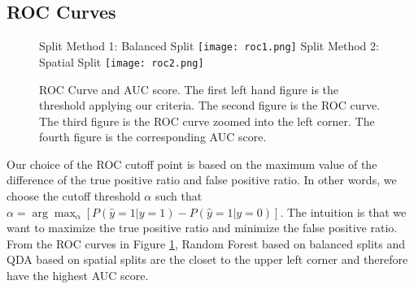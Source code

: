 \documentclass[letterpaper,11pt]{article}
\begin{document}
\subsection{ROC Curves}

\begin{figure}[!hbt]
    \centering
    Split Method 1: Balanced Split
    \texttt{[image: roc1.png]}
    Split Method 2: Spatial Split
    \texttt{[image: roc2.png]}
    \caption{ROC Curve and AUC score. The first left hand figure is the threshold applying our criteria. The second figure is the ROC curve. The third figure is the ROC curve zoomed into the left corner. The fourth figure is the corresponding AUC score.}
    \label{fig:roc}
\end{figure}

Our choice of the ROC cutoff point is based on the maximum value of the difference of the true positive ratio and false positive ratio. In other words, we choose the cutoff threshold $\alpha$ such that $\alpha = \arg\max_\alpha [P(\hat y = 1|y = 1) - P(\hat y=1|y=0)]$. The intuition is that we want to maximize the true positive ratio and minimize the false positive ratio. From the ROC curves in Figure \ref{fig:roc}, Random Forest based on balanced splits and QDA based on spatial splits are the closet to the upper left corner and therefore have the highest AUC score. 
\end{document}
